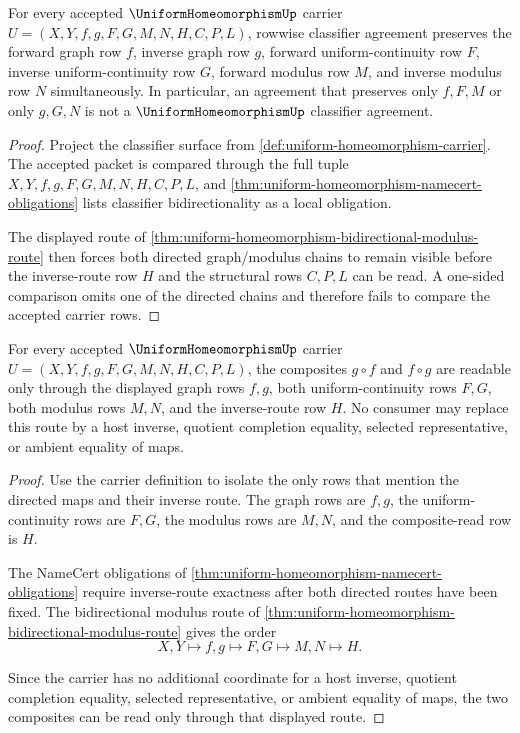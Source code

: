 \begin{theorem}
\label{thm:uniform-homeomorphism-obligation-classifier-bidirectionality}
For every accepted $\UniformHomeomorphismUp$ carrier $U=(X,Y,f,g,F,G,M,N,H,C,P,L)$, rowwise classifier agreement preserves the forward graph row $f$, inverse graph row $g$, forward uniform-continuity row $F$, inverse uniform-continuity row $G$, forward modulus row $M$, and inverse modulus row $N$ simultaneously. In particular, an agreement that preserves only $f,F,M$ or only $g,G,N$ is not a $\UniformHomeomorphismUp$ classifier agreement.
\end{theorem}
\begin{proof}
Project the classifier surface from \autoref{def:uniform-homeomorphism-carrier}. The accepted packet is compared through the full tuple $X,Y,f,g,F,G,M,N,H,C,P,L$, and \autoref{thm:uniform-homeomorphism-namecert-obligations} lists classifier bidirectionality as a local obligation.

The displayed route of \autoref{thm:uniform-homeomorphism-bidirectional-modulus-route} then forces both directed graph/modulus chains to remain visible before the inverse-route row $H$ and the structural rows $C,P,L$ can be read. A one-sided comparison omits one of the directed chains and therefore fails to compare the accepted carrier rows.
\end{proof}

\begin{theorem}
\label{thm:uniform-homeomorphism-inverse-route-exactness}
For every accepted $\UniformHomeomorphismUp$ carrier $U=(X,Y,f,g,F,G,M,N,H,C,P,L)$, the composites $g\circ f$ and $f\circ g$ are readable only through the displayed graph rows $f,g$, both uniform-continuity rows $F,G$, both modulus rows $M,N$, and the inverse-route row $H$. No consumer may replace this route by a host inverse, quotient completion equality, selected representative, or ambient equality of maps.
\end{theorem}
\begin{proof}
Use the carrier definition to isolate the only rows that mention the directed maps and their inverse route. The graph rows are $f,g$, the uniform-continuity rows are $F,G$, the modulus rows are $M,N$, and the composite-read row is $H$.

The NameCert obligations of \autoref{thm:uniform-homeomorphism-namecert-obligations} require inverse-route exactness after both directed routes have been fixed. The bidirectional modulus route of \autoref{thm:uniform-homeomorphism-bidirectional-modulus-route} gives the order
$$
X,Y\longmapsto f,g\longmapsto F,G\longmapsto M,N\longmapsto H.
$$

Since the carrier has no additional coordinate for a host inverse, quotient completion equality, selected representative, or ambient equality of maps, the two composites can be read only through that displayed route.
\end{proof}

